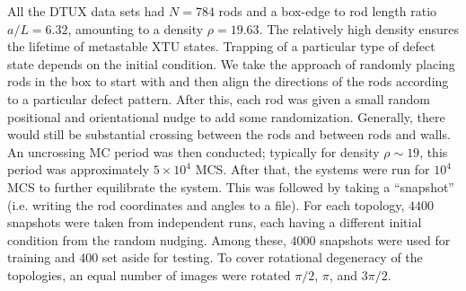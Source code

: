 All the DTUX data sets had $N=784$ rods and a box-edge to rod length ratio $a/L=6.32$, amounting to a density $\rho=19.63$. The relatively high density ensures the lifetime of metastable XTU states.
Trapping of a particular type of defect state depends on the initial condition. We take the approach of randomly placing rods in the box to start with and then align the directions of the rods according to a particular defect pattern. After this, each rod was given a small random positional and orientational nudge to add some randomization. Generally, there would still be substantial crossing between the rods and between rods and walls.
An uncrossing MC period was then conducted; typically for density $\rho \sim 19$, this period was approximately $5\times 10^4$ MCS.
After that, the systems were run for $10^4$ MCS to further equilibrate the system. This was followed by taking a ``snapshot'' (i.e. writing the rod coordinates and angles to a file). For each topology, $4400$ snapshots were taken from independent runs, each having a different initial condition from the random nudging. Among these, $4000$ snapshots were used for training and $400$ set aside for testing. To cover rotational degeneracy of the topologies, an equal number of images were rotated $\pi/2$, $\pi$, and $3\pi/2$.
\\



